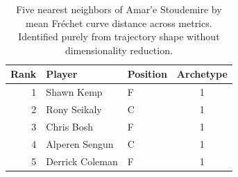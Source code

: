 \begin{table}[htbp]
  \centering\small
  \begin{tabular}{rllc}
    \toprule
    Rank & Player & Position & Archetype \\
    \midrule
    1 & Shawn Kemp & F & 1 \\
    2 & Rony Seikaly & C & 1 \\
    3 & Chris Bosh & F & 1 \\
    4 & Alperen Sengun & C & 1 \\
    5 & Derrick Coleman & F & 1 \\
    \bottomrule
  \end{tabular}
  \caption{Five nearest neighbors of Amar'e Stoudemire by mean Fr\'{e}chet curve distance across metrics. Identified purely from trajectory shape without dimensionality reduction.}
  \label{tab:Amar_e_Stoudemire_frechet_curve_neighbors}
\end{table}

